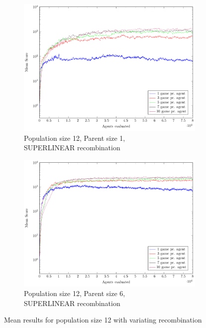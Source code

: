 \begin{figure}
    \begin{subfigure}[b]{0.49\textwidth}
    	\caption{Population size 12, Parent size 1,\\SUPERLINEAR recombination}
        \includegraphics[width=\textwidth]{data/cma_population_offspring/12x_split/superlinear_l12_o1/mean/PlotFile.pdf}
    \end{subfigure}
    \begin{subfigure}[b]{0.49\textwidth}
    	\caption{Population size 12, Parent size 6,\\SUPERLINEAR recombination}
        \includegraphics[width=\textwidth]{data/cma_population_offspring/12x_split/superlinear_l12_o6/mean/PlotFile.pdf}
    \end{subfigure}
    
    \caption{Mean results for population size 12 with variating recombination}
\end{figure}

